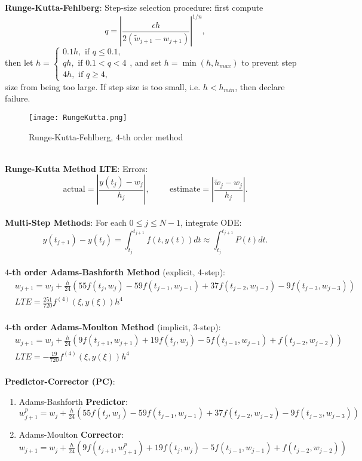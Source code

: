 \documentclass{article}
\begin{document}
\textbf{Runge-Kutta-Fehlberg}: Step-size selection procedure: first compute $$q = \left| \frac{\epsilon h}{2(\tilde{w}_{j + 1} - w_{j + 1})} \right| ^{1/n},$$ then let $h = \begin{cases}
    0.1h, \text{ if } q \leq 0.1, \\
    qh, \text{ if } 0.1 < q < 4 \\
    4h, \text{ if } q \geq 4,
\end{cases}$, and set $h = \min(h, h_{max})$ to prevent step size from being too large. If step size is too small, i.e. $h < h_{min}$, then declare failure. \\
\begin{figure*}[htp]
    \centering
    \texttt{[image: RungeKutta.png]}
    \caption{Runge-Kutta-Fehlberg, 4-th order method}
\end{figure*} \\
\textbf{Runge-Kutta Method LTE}: Errors: $$\text{actual} = \left| \frac{y(t_j) - w_j}{h_j} \right|, \hspace{1cm} \text{estimate} = \left| \frac{\tilde{w}_j - w_j}{h_j} \right|.$$ \\
\textbf{Multi-Step Methods}: For each $0 \leq j \leq N - 1$, integrate ODE: $$y(t_{j + 1}) - y(t_j) = \int_{t_j}^{t_{j + 1}} f(t, y(t)) dt \approx \int_{t_j}^{t_{j + 1}} P(t) dt.$$ \\ 
\textbf{$4$-th order Adams-Bashforth Method} (explicit, 4-step): \begin{align*}
    &w_{j + 1} = w_j + \frac{h}{24}(55f(t_{j}, w_{j}) - 59f(t_{j - 1}, w_{j - 1}) + 37f(t_{j - 2}, w_{j - 2}) - 9f(t_{j - 3}, w_{j - 3})) \\
    &LTE = \frac{251}{720} f^{(4)}(\xi, y(\xi)) h^4
\end{align*} \\
\textbf{$4$-th order Adams-Moulton Method} (implicit, 3-step): \begin{align*}
    &w_{j + 1} = w_j + \frac{h}{24}(9f(t_{j + 1}, w_{j + 1}) + 19f(t_j, w_j) - 5f(t_{j - 1}, w_{j - 1}) + f(t_{j - 2}, w_{j - 2})) \\
    &LTE = -\frac{19}{720} f^{(4)}(\xi, y(\xi)) h^4
\end{align*} \\
\textbf{Predictor-Corrector (PC)}: \begin{enumerate}
    \item Adams-Bashforth \textbf{Predictor}: $w_{j + 1}^p = w_j + \frac{h}{24}(55f(t_{j}, w_{j}) - 59f(t_{j - 1}, w_{j - 1}) + 37f(t_{j - 2}, w_{j - 2}) - 9f(t_{j - 3}, w_{j - 3}))$
    \item Adams-Moulton \textbf{Corrector}: $w_{j + 1} = w_j + \frac{h}{24}(9f(t_{j + 1}, w_{j + 1}^p) + 19f(t_j, w_j) - 5f(t_{j - 1}, w_{j - 1}) + f(t_{j - 2}, w_{j - 2}))$
\end{enumerate} $ $ \\
\end{document}
